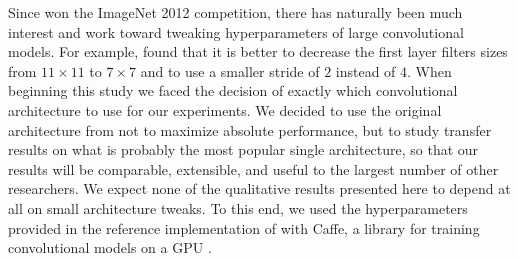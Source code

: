 Since \cite{Krizhevsky-2012} won the ImageNet 2012 competition, there has naturally been much interest and work toward tweaking hyperparameters of large convolutional models. For example, \cite{Zeiler+et+al-arxiv2013b} found that it is better to decrease the first layer filters sizes from $11\times 11$ to $7\times 7$ and to use a smaller stride of $2$ instead of $4$. When beginning this study we faced the decision of exactly which convolutional architecture to use for our experiments. We decided to use the original architecture from \cite{Krizhevsky-2012} not to maximize absolute performance, but to study transfer results on what is probably the most popular single architecture, so that our results will be comparable, extensible, and useful to the largest number of other researchers. We expect none of the qualitative results presented here to depend at all on small architecture tweaks.
To this end, we used the hyperparameters provided in the reference implementation of  \cite{Krizhevsky-2012} with Caffe, a library for training convolutional models on a GPU \citep{Jia13caffe}.




